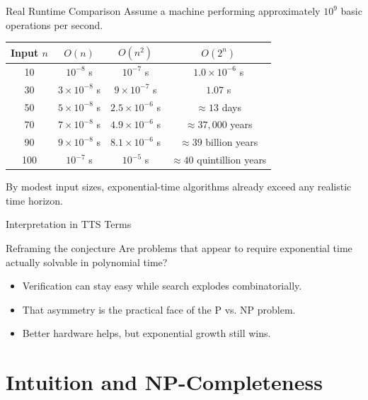 \documentclass[aspectratio=43]{beamer}
\begin{document}
\begin{frame}{Real Runtime Comparison}
Assume a machine performing approximately $10^9$ basic operations per second.

\small
\begin{center}
\begin{tabular}{@{}cccc@{}}
\toprule
Input $n$ & $O(n)$ & $O(n^2)$ & $O(2^n)$ \\
\midrule
10  & $10^{-8}$ s & $10^{-7}$ s & $1.0\times10^{-6}$ s \\
30  & $3\times10^{-8}$ s & $9\times10^{-7}$ s & $1.07$ s \\
50  & $5\times10^{-8}$ s & $2.5\times10^{-6}$ s & $\approx 13$ days \\
70  & $7\times10^{-8}$ s & $4.9\times10^{-6}$ s & $\approx 37{,}000$ years \\
90  & $9\times10^{-8}$ s & $8.1\times10^{-6}$ s & $\approx 39$ billion years \\
100 & $10^{-7}$ s & $10^{-5}$ s & $\approx 40$ quintillion years \\
\bottomrule
\end{tabular}
\end{center}

\normalsize
By modest input sizes, exponential-time algorithms already exceed any realistic time horizon.
\end{frame}

\begin{frame}{Interpretation in TTS Terms}
\begin{block}{Reframing the conjecture}
Are problems that appear to require exponential time actually solvable in polynomial time?
\end{block}

\begin{itemize}
    \item Verification can stay easy while search explodes combinatorially.
    \item That asymmetry is the practical face of the P vs\@. NP problem.
    \item Better hardware helps, but exponential growth still wins.
\end{itemize}
\end{frame}

\section{Intuition and NP-Completeness}
\end{document}
